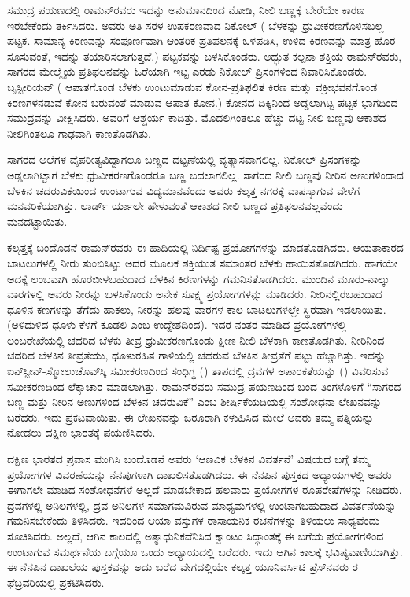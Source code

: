 ಸಮುದ್ರ ಪಯಣದಲ್ಲಿ ರಾಮನ್‍ರವರು ಇದನ್ನು ಅನುಮಾನದಿಂದ ನೋಡಿ, ನೀಲಿ ಬಣ್ಣಕ್ಕೆ ಬೇರೆಯೇ ಕಾರಣ ಇರಬೇಕೆಂದು ತರ್ಕಿಸಿದರು. ಅವರು ಅತಿ ಸರಳ ಉಪಕರಣವಾದ ನಿಕೋಲ್ ( ಬೆಳಕನ್ನು ಧ್ರುವೀಕರಣಗೊಳಿಸಬಲ್ಲ ಪಟ್ಟಕ. ಸಾಮಾನ್ಯ ಕಿರಣವನ್ನು ಸಂಪೂರ್ಣವಾಗಿ ಆಂತರಿಕ ಪ್ರತಿಫಲನಕ್ಕೆ ಒಳಪಡಿಸಿ, ಉಳಿದ ಕಿರಣವನ್ನು ಮಾತ್ರ ಹೊರ ಸೂಸುವಂತೆ, ಇದನ್ನು ತಯಾರಿಸಲಾಗುತ್ತದೆ.) ಪಟ್ಟಕವನ್ನು ಬಳಸಿಕೊಂಡರು. ಅದ್ಭುತ ಕಲ್ಪನಾ ಶಕ್ತಿಯ ರಾಮನ್‍ರವರು, ಸಾಗರದ ಮೇಲ್ಮೈಯ ಪ್ರತಿಫಲನವನ್ನು ಓರೆಯಾಗಿ ಇಟ್ಟ ಎರಡು ನಿಕೋಲ್ ಪ್ರಿಸಂಗಳಿಂದ ನಿವಾರಿಸಿಕೊಂಡರು. ಬೃಸ್ಟೀರಿಯನ್ ( ಆಪಾತಗೊಂಡ ಬೆಳಕು ಉಂಟುಮಾಡುವ ಕೋನ-ಪ್ರತಿಫಲಿತ ಕಿರಣ ಮತ್ತು ವಕ್ರೀಭವನಗೊಂಡ ಕಿರಣಗಳನಡುವೆ ಕೋನ ಬರುವಂತೆ ಮಾಡುವ ಆಪಾತ ಕೋನ.) ಕೋನದ ದಿಕ್ಕಿನಿಂದ ಅಡ್ಡಲಾಗಿಟ್ಟ ಪಟ್ಟಕ ಭಾಗದಿಂದ ಸಮುದ್ರವನ್ನು ವೀಕ್ಷಿಸಿದರು. ಅವರಿಗೆ ಆಶ್ಚರ್ಯ ಕಾದಿತ್ತು. ಮೊದಲಿಗಿಂತಲೂ ಹೆಚ್ಚು ದಟ್ಟ ನೀಲಿ ಬಣ್ಣವು ಆಕಾಶದ ನೀಲಿಗಿಂತಲೂ ಗಾಢವಾಗಿ ಕಾಣತೊಡಗಿತು. 

ಸಾಗರದ ಅಲೆಗಳ ವೈಪರೀತ್ಯವಿದ್ದಾಗಲೂ ಬಣ್ಣದ ದಟ್ಟಣೆಯಲ್ಲಿ ವ್ಯತ್ಯಾಸವಾಗಲಿಲ್ಲ. ನಿಕೋಲ್ ಪ್ರಿಸಂಗಳನ್ನು ಅಡ್ಡಲಾಗಿಟ್ಟಾಗ ಬೆಳಕು ಧ್ರುವೀಕರಣಗೊಂಡರೂ ಬಣ್ಣ ಬದಲಾಗಲಿಲ್ಲ. ಸಾಗರದ ನೀಲಿ ಬಣ್ಣವು ನೀರಿನ ಅಣುಗಳಿಂದಾದ ಬೆಳಕಿನ ಚದರುವಿಕೆಯಿಂದ ಉಂಟಾಗುವ ವಿದ್ಯಮಾನವೆಂದು ಅವರು ಕಲ್ಕತ್ತ ನಗರಕ್ಕೆ ವಾಪಸ್ಸಾಗುವ ವೇಳೆಗೆ ಮನವರಿಕೆಯಾಗಿತ್ತು. ಲಾರ್ಡ್ ರ್ಯಾಲೇ ಹೇಳುವಂತೆ ಆಕಾಶದ ನೀಲಿ ಬಣ್ಣದ ಪ್ರತಿಫಲನವಲ್ಲವೆಂದು ಮನದಟ್ಟಾಯಿತು.

ಕಲ್ಕತ್ತಕ್ಕೆ ಬಂದೊಡನೆ ರಾಮನ್‍ರವರು ಈ ಹಾದಿಯಲ್ಲಿ ನಿರ್ದಿಷ್ಟ ಪ್ರಯೋಗಗಳನ್ನು ಮಾಡತೊಡಗಿದರು. ಆಯತಾಕಾರದ ಬಾಟಲುಗಳಲ್ಲಿ ನೀರು ತುಂಬಿಸಿಟ್ಟು ಅದರ ಮೂಲಕ ಶಕ್ತಿಯುತ ಸಮಾಂತರ ಬೆಳಕು ಹಾಯಿಸತೊಡಗಿದರು. ಹಾಗೆಯೇ ಅದಕ್ಕೆ ಲಂಬವಾಗಿ ಹೊರಬೀಳಬಹುದಾದ ಬೆಳಕಿನ ಕಿರಣಗಳನ್ನು ಗಮನಿಸತೊಡಗಿದರು. ಮುಂದಿನ ಮೂರು-ನಾಲ್ಕು ವಾರಗಳಲ್ಲಿ ಅವರು ನೀರನ್ನು ಬಳಸಿಕೊಂಡು ಅನೇಕ ಸೂಕ್ಷ್ಮ ಪ್ರಯೋಗಗಳನ್ನು ಮಾಡಿದರು. ನೀರಿನಲ್ಲಿರಬಹುದಾದ ಧೂಳಿನ ಕಣಗಳನ್ನು ತೆಗೆದು ಹಾಕಲು, ನೀರನ್ನು ಹಲವು ವಾರಗಳ ಕಾಲ ಬಾಟಲುಗಳಲ್ಲೇ ಸ್ಥಿರವಾಗಿ ಇಡಲಾಯಿತು. (ಅಳಿದುಳಿದ ಧೂಳು ಕೆಳಗೆ ಕೂಡಲಿ ಎಂಬ ಉದ್ದೇಶದಿಂದ). ಇದರ ನಂತರ ಮಾಡಿದ ಪ್ರಯೋಗಗಳಲ್ಲಿ ಲಂಬರೇಖೆಯಲ್ಲಿ ಚದರಿದ ಬೆಳಕು ತೀವ್ರ ಧ್ರುವೀಕರಣಗೊಂಡು ಕ್ಷೀಣ ನೀಲಿ ಬೆಳಕಾಗಿ ಕಾಣತೊಡಗಿತು. ನೀರಿನಿಂದ ಚದರಿದ ಬೆಳಕಿನ ತೀವ್ರತೆಯು, ಧೂಳುರಹಿತ ಗಾಳಿಯಲ್ಲಿ ಚದರುವ ಬೆಳಕಿನ ತೀವ್ರತೆಗೆ  ಪಟ್ಟು ಹೆಚ್ಚಾಗಿತ್ತು. ಇದನ್ನು ಐನ್‍ಸ್ಟೀನ್-ಸ್ಮೋಲುಚೊವ್‍ಸ್ಕಿ ಸಮೀಕರಣದಿಂದ ಸಂಧಿಗ್ಧ () ತಾಪದಲ್ಲಿ ದ್ರವಗಳ ಅಪಾರಕತೆಯನ್ನು () ವಿವರಿಸುವ ಸಮೀಕರಣದಿಂದ ಲೆಕ್ಕಾಚಾರ ಮಾಡಲಾಗಿತ್ತು. ರಾಮನ್‍ರವರು ಸಮುದ್ರ ಪಯಣದಿಂದ ಬಂದ ತಿಂಗಳೊಳಗೆ “ಸಾಗರದ ಬಣ್ಣ ಮತ್ತು ನೀರಿನ ಅಣುಗಳಿಂದ ಬೆಳಕಿನ ಚದರುವಿಕೆ”  ಎಂಬ ಶೀರ್ಷಿಕೆಯಡಿಯಲ್ಲಿ ಸಂಶೋಧನಾ ಲೇಖನವನ್ನು ಬರೆದರು. ಇದು \textit{}  ಪ್ರಕಟವಾಯಿತು. ಈ ಲೇಖನವನ್ನು ಜರೂರಾಗಿ ಕಳುಹಿಸಿದ ಮೇಲೆ ಅವರು ತಮ್ಮ ಪತ್ನಿಯನ್ನು ನೋಡಲು ದಕ್ಷಿಣ ಭಾರತಕ್ಕೆ ಪಯಣಿಸಿದರು.

ದಕ್ಷಿಣ ಭಾರತದ ಪ್ರವಾಸ ಮುಗಿಸಿ ಬಂದೊಡನೆ ಅವರು ‘ಆಣವಿಕ ಬೆಳಕಿನ ವಿವರ್ತನೆ’  ವಿಷಯದ ಬಗ್ಗೆ ತಮ್ಮ ಪ್ರಯೋಗಗಳ ವಿವರಣೆಯನ್ನು ನೆನಪುಗಳಾಗಿ ದಾಖಲಿಸತೊಡಗಿದರು. ಈ ನೆನಪಿನ ಪುಸ್ತಕದ ಅಧ್ಯಾಯಗಳಲ್ಲಿ ಅವರು ಈಗಾಗಲೇ ಮಾಡಿದ ಸಂಶೋಧನೆಗಳೆ ಅಲ್ಲದೆ ಮಾಡಬೇಕಾದ ಹಲವಾರು ಪ್ರಯೋಗಗಳ ರೂಪರೇಷೆಗಳನ್ನು ನೀಡಿದರು. ದ್ರವಗಳಲ್ಲಿ ಅನಿಲಗಳಲ್ಲಿ, ದ್ರವ-ಅನಿಲಗಳ ಸಮಾಗಮವಿರುವ ಮಾಧ್ಯಮಗಳಲ್ಲಿ ಉಂಟಾಗಬಹುದಾದ ವಿವರ್ತನೆಯನ್ನು ಗಮನಿಸಬೇಕೆಂದು ತಿಳಿಸಿದರು. ಇದರಿಂದ ಆಯಾ ವಸ್ತುಗಳ ರಾಸಾಯನಿಕ ರಚನೆಗಳನ್ನು ತಿಳಿಯಲು ಸಾಧ್ಯವೆಂದು ಸೂಚಿಸಿದರು. ಅಲ್ಲದೆ, ಆಗಿನ ಕಾಲದಲ್ಲಿ ಅತ್ಯಾಧುನಿಕವೆನಿಸಿದ ಕ್ವಾಂಟಂ ಸಿದ್ಧಾಂತಕ್ಕೆ ಈ ಬಗೆಯ ಪ್ರಯೋಗಗಳಿಂದ ಉಂಟಾಗುವ ಸಮರ್ಥನೆಯ ಬಗ್ಗೆಯೂ ಒಂದು ಅಧ್ಯಾಯದಲ್ಲಿ ಬರೆದರು. ಇದು ಆಗಿನ ಕಾಲಕ್ಕೆ ಭವಿಷ್ಯವಾಣಿಯಾಗಿತ್ತು. ಈ ನೆನಪಿನ ದಾಖಲೆಯ ಪುಸ್ತಕವನ್ನು ಅದು ಬರೆದ ವೇಗದಲ್ಲಿಯೇ ಕಲ್ಕತ್ತ ಯೂನಿವರ್ಸಿಟಿ ಪ್ರೆಸ್‍ನವರು ರ ಫೆಬ್ರವರಿಯಲ್ಲಿ ಪ್ರಕಟಿಸಿದರು.

